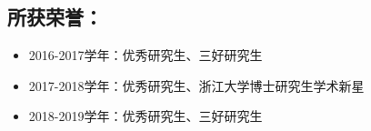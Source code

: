 \begin{publications}




\section*{所获荣誉：}

\begin{itemize}
    
\item 2016-2017学年：优秀研究生、三好研究生

\item 2017-2018学年：优秀研究生、浙江大学博士研究生学术新星

\item 2018-2019学年：优秀研究生、三好研究生

\end{itemize}

\end{publications}

